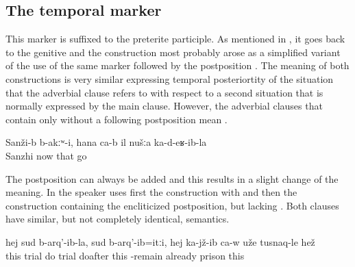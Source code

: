 
\subsection{The temporal marker  }
\label{sec:temporal marker -la}

This marker is suffixed to the preterite participle. As mentioned in , it goes back to the genitive and the construction most probably arose as a simplified variant of the use of the same marker followed by the postposition . The meaning of both constructions is very similar expressing temporal posteriortity of the situation that the adverbial clause refers to with respect to a second situation that is normally expressed by the main clause. However, the adverbial clauses that contain only  without a following postposition mean .
%
\begin{exe}
	\ex	\label{ex:‎In Sanzhi there was no (such plant), now there is, since we moved here}
	\gll	Sanži-b	b-akːʷ-i,	hana	ca-b	il	nušːa	ka-d-eʁ-ib-la\\
		Sanzhi		now		that		go\\
	\glt	{}
\end{exe}

The postposition can always be added and this results in a slight change of the meaning. In  the speaker uses first the construction with  and then the construction containing the encliticized postposition, but lacking . Both clauses have similar, but not completely identical, semantics. 
%
\begin{exe}
	\ex	\label{ex:Since the trial, after the trial was made, he is already sitting in prison}
	\gll	hej	sud	b-arq'-ib-la,	sud	b-arq'-ib=itːi,	hej	ka-jž-ib	ca-w	uže	tusnaq-le	hež\\
		this	trial	do	trial	doafter	this	-remain		already	prison	this\\
	\glt	{}
\end{exe}

